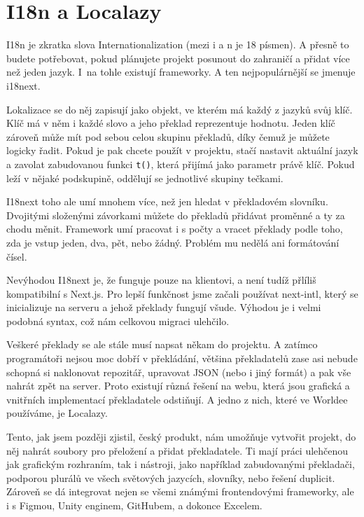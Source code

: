 \section{I18n a Localazy}

I18n je zkratka slova Internationalization (mezi i a n je 18 písmen)\cite{I18nMeaning}. A přesně to budete potřebovat, pokud plánujete projekt posunout do zahraničí a přidat více než jeden jazyk. I~na tohle existují frameworky. A ten nejpopulárnější se jmenuje i18next\cite{I18nextDocs}.

Lokalizace se do něj zapisují jako objekt, ve kterém má každý z jazyků svůj klíč. Klíč má v něm i každé slovo a jeho překlad reprezentuje hodnotu. Jeden klíč zároveň může mít pod sebou celou skupinu překladů, díky čemuž je můžete logicky řadit. Pokud je pak chcete použít v projektu, stačí nastavit aktuální jazyk a zavolat zabudovanou funkci \texttt{t()}, která přijímá jako parametr právě klíč. Pokud leží v nějaké podskupině, oddělují se jednotlivé skupiny tečkami.

I18next toho ale umí mnohem více, než jen hledat v překladovém slovníku\cite{I18nextVideo}. Dvojitými složenými závorkami můžete do překladů přidávat proměnné a ty za chodu měnit. Framework umí pracovat i s počty a vracet překlady podle toho, zda je vstup jeden, dva, pět, nebo žádný. Problém mu nedělá ani formátování čísel.

Nevýhodou I18next je, že funguje pouze na klientovi, a není tudíž přlíliš kompatibilní s Next.js. Pro lepší funkčnost jsme začali používat next-intl, který se inicializuje na serveru a jehož překlady fungují všude. Výhodou je i velmi podobná syntax, což nám celkovou migraci ulehčilo.

Veškeré překlady se ale stále musí napsat někam do projektu. A zatímco programátoři nejsou moc dobří v překládání, většina překladatelů zase asi nebude schopná si naklonovat repozitář, upravovat JSON (nebo i jiný formát) a pak vše nahrát zpět na server. Proto existují různá řešení na webu, která jsou grafická a vnitřních implementací překladatele odstiňují. A jedno z nich, které ve Worldee používáme, je Localazy.

Tento, jak jsem později zjistil, český produkt, nám umožňuje vytvořit projekt, do něj nahrát soubory pro přeložení a přidat překladatele. Ti mají práci ulehčenou jak grafickým rozhraním, tak i nástroji, jako například zabudovanými překladači, podporou plurálů ve všech světových jazycích, slovníky, nebo řešení duplicit\cite{LocalazyPricing}. Zároveň se dá integrovat nejen se všemi známými frontendovými frameworky, ale i s Figmou, Unity enginem, GitHubem, a dokonce Excelem\cite{LocalazyIntegration}.